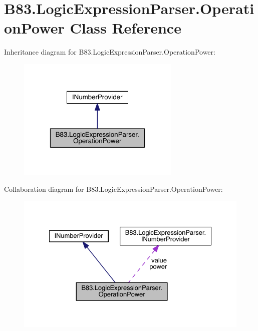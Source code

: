 \hypertarget{class_b83_1_1_logic_expression_parser_1_1_operation_power}{}\section{B83.\+Logic\+Expression\+Parser.\+Operation\+Power Class Reference}
\label{class_b83_1_1_logic_expression_parser_1_1_operation_power}


Inheritance diagram for B83.\+Logic\+Expression\+Parser.\+Operation\+Power\+:\nopagebreak
\begin{figure}[H]
\begin{center}
\leavevmode
\includegraphics[width=220pt]{class_b83_1_1_logic_expression_parser_1_1_operation_power__inherit__graph}
\end{center}
\end{figure}


Collaboration diagram for B83.\+Logic\+Expression\+Parser.\+Operation\+Power\+:\nopagebreak
\begin{figure}[H]
\begin{center}
\leavevmode
\includegraphics[width=330pt]{class_b83_1_1_logic_expression_parser_1_1_operation_power__coll__graph}
\end{center}
\end{figure}
